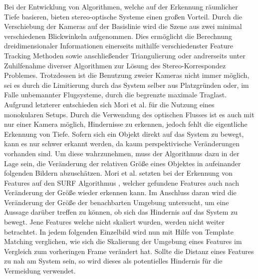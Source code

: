 \noindent
Bei der Entwicklung von Algorithmen, welche auf der Erkennung räumlicher Tiefe basieren, bieten stereo-optische Systeme einen großen Vorteil. Durch die Verschiebung der Kameras auf der Basislinie wird die Szene aus zwei minimal verschiedenen Blickwinkeln aufgenommen. Dies ermöglicht die Berechnung dreidimensionaler Informationen einerseits mithilfe verschiedenster Feature Tracking Methoden sowie anschließender Triangulierung oder andrerseits unter Zuhilfenahme diverser Algorithmen zur Lösung des Stereo-Korrespondez Problemes. 
\noindent
Trotzdessen ist die Benutzung zweier Kameras nicht immer möglich, sei es durch die Limitierung durch das System selber aus Platzgründen oder, im Falle unbemannter Flugsysteme, durch die begrenzte maximale Traglast. Aufgrund letzterer entschieden sich Mori et al. \cite{mori2013first} für die Nutzung eines monokularen Setups. Durch die Verwendung des optischen Flusses ist es auch mit nur einer Kamera möglich, Hindernisse zu erkennen, jedoch fehlt die eigentliche Erkennung von Tiefe. Sofern sich ein Objekt direkt auf das System zu bewegt, kann es nur schwer erkannt werden, da kaum perspektivische Veränderungen vorhanden sind. Um diese wahrzunehmen, muss der Algorithmus dazu in der Lage sein, die Veränderung der relativen Größe eines Objektes in aufeinander folgenden Bildern abzuschätzen. Mori et al. setzten bei der Erkennung von Features auf den SURF Algorithmus  \cite{bay2006surf} , welcher gefundene Features auch nach Veränderung der Größe wieder erkennen kann. Im Anschluss daran wird die Veränderung der Größe der benachbarten Umgebung untersucht, um eine Aussage darüber treffen zu können, ob sich das Hindernis auf das System zu bewegt. Jene Features welche nicht skaliert wurden, werden nicht weiter betrachtet. 
In jedem folgenden Einzelbild wird nun mit Hilfe von Template Matching verglichen, wie sich die Skalierung der Umgebung eines Features im Vergleich zum vorheringen Frame verändert hat. Sollte die Distanz eines Features zu nah am System sein, so wird dieses als potentielles Hindernis für die Vermeidung verwendet.
